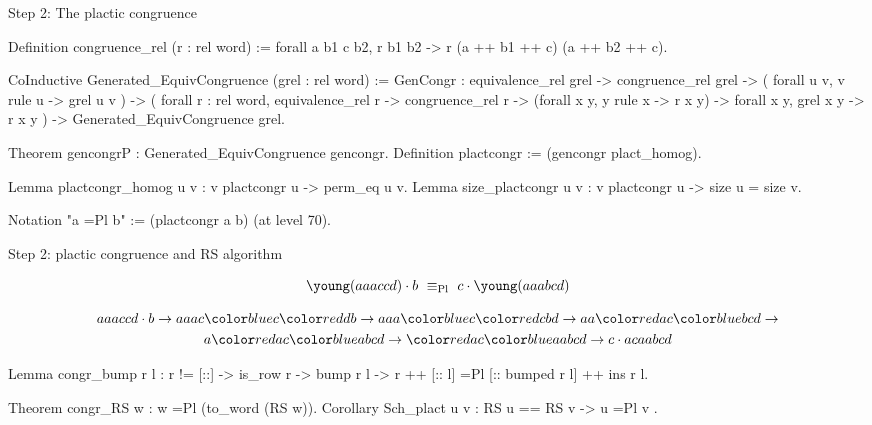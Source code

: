 \documentclass[compress,11pt]{beamer}
\begin{document}
\begin{frame}[fragile]{Step 2: The plactic congruence}

  \begin{coqcode}
Definition congruence_rel (r : rel word) :=
  forall a b1 c b2, r b1 b2 -> r (a ++ b1 ++ c) (a ++ b2 ++ c).

CoInductive Generated_EquivCongruence (grel : rel word) :=
  GenCongr : equivalence_rel grel ->
             congruence_rel grel ->
             ( forall u v, v \in rule u -> grel u v ) ->
             ( forall r : rel word,
                      equivalence_rel r -> congruence_rel r ->
                      (forall x y, y \in rule x -> r x y) ->
                      forall x y, grel x y -> r x y
             ) -> Generated_EquivCongruence grel.

Theorem gencongrP : Generated_EquivCongruence gencongr.
Definition plactcongr := (gencongr plact_homog).

Lemma plactcongr_homog u v : v \in plactcongr u -> perm_eq u v.
Lemma size_plactcongr u v : v \in plactcongr u -> size u = size v.

Notation "a =Pl b" := (plactcongr a b) (at level 70).
  \end{coqcode}
\end{frame}

\begin{frame}[fragile]{Step 2: plactic congruence and RS algorithm}


\[ \young(aaaccd) \cdot b\ \equiv_\text{Pl}\ c \cdot \young(aaabcd) \]


\begin{multline*}
  aaaccd\cdot b \to 
  aaac\blu{c}\red{db} \to 
  aaa\blu{c}\red{cb}d \to 
  aa\red{ac}\blu{b}cd \to\\
  a\red{ac}\blu{a}bcd \to 
  \red{ac}\blu{a}abcd \to 
  c\cdot acaabcd
\end{multline*}

  \begin{coqcode}
Lemma congr_bump r l :
  r != [::] -> is_row r -> bump r l ->
  r ++ [:: l] =Pl [:: bumped r l] ++ ins r l.

Theorem congr_RS w : w =Pl (to_word (RS w)).
Corollary Sch_plact u v : RS u == RS v -> u =Pl v .
  \end{coqcode}
\end{frame}
\end{document}
